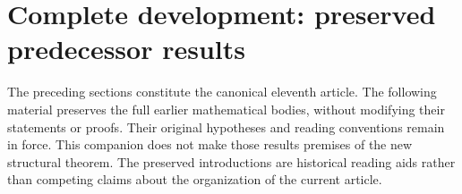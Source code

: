 \newif\ifcomplete\completetrue


\clearpage
\section*{Complete development: preserved predecessor results}
The preceding sections constitute the canonical eleventh article.
The following material preserves the full earlier mathematical bodies,
without modifying their statements or proofs. Their original hypotheses
and reading conventions remain in force. This companion does not make
those results premises of the new structural theorem. The preserved
introductions are historical reading aids rather than competing claims
about the organization of the current article.






















